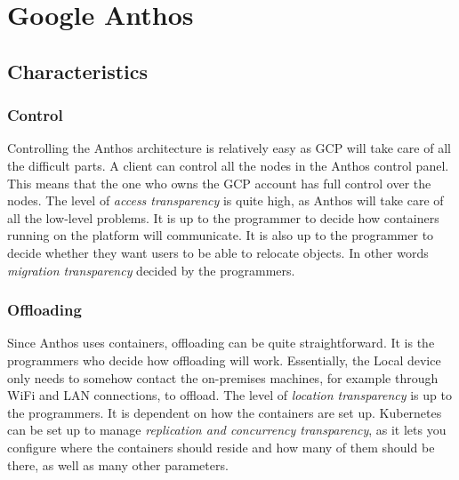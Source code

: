 















\section{Google Anthos}
\subsection{Characteristics}
\subsubsection{Control}
Controlling the Anthos architecture is relatively easy as GCP will take care of all the difficult parts. A client can control all the nodes in the Anthos control panel. This means that the one who owns the GCP account has full control over the nodes. The level of \textit{access transparency} is quite high, as Anthos will take care of all the low-level problems. It is up to the programmer to decide how containers running on the platform will communicate. It is also up to the programmer to decide whether they want users to be able to relocate objects. In other words \textit{migration transparency} decided by the programmers.

\subsubsection{Offloading}
Since Anthos uses containers, offloading can be quite straightforward. It is the programmers who decide how offloading will work. Essentially, the Local device only needs to somehow contact the on-premises machines, for example through WiFi and LAN connections, to offload. The level of \textit{location transparency} is up to the programmers. It is dependent on how the containers are set up. Kubernetes can be set up to manage \textit{replication and concurrency transparency}, as it lets you configure where the containers should reside and how many of them should be there, as well as many other parameters.


